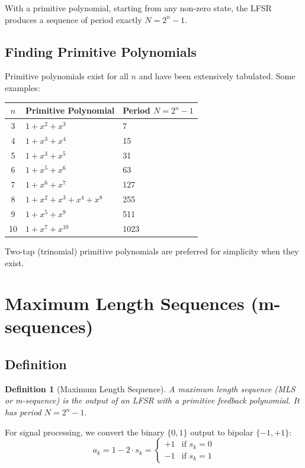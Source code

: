 \documentclass[11pt]{article}
\newtheorem{definition}{Definition}
\begin{document}
With a primitive polynomial, starting from any non-zero state, the LFSR produces a sequence of period exactly $N = 2^n - 1$.

\subsection{Finding Primitive Polynomials}

Primitive polynomials exist for all $n$ and have been extensively tabulated. Some examples:

\begin{center}
\begin{tabular}{cll}
\toprule
$n$ & Primitive Polynomial & Period $N = 2^n - 1$ \\
\midrule
3 & $1 + x^2 + x^3$ & 7 \\
4 & $1 + x^3 + x^4$ & 15 \\
5 & $1 + x^3 + x^5$ & 31 \\
6 & $1 + x^5 + x^6$ & 63 \\
7 & $1 + x^6 + x^7$ & 127 \\
8 & $1 + x^2 + x^3 + x^4 + x^8$ & 255 \\
9 & $1 + x^5 + x^9$ & 511 \\
10 & $1 + x^7 + x^{10}$ & 1023 \\
\bottomrule
\end{tabular}
\end{center}

Two-tap (trinomial) primitive polynomials are preferred for simplicity when they exist.

\section{Maximum Length Sequences (m-sequences)}

\subsection{Definition}

\begin{definition}[Maximum Length Sequence]
A maximum length sequence (MLS or m-sequence) is the output of an LFSR with a primitive feedback polynomial. It has period $N = 2^n - 1$.
\end{definition}

For signal processing, we convert the binary $\{0, 1\}$ output to bipolar $\{-1, +1\}$:
\begin{equation}
a_k = 1 - 2 \cdot s_k = \begin{cases} +1 & \text{if } s_k = 0 \\ -1 & \text{if } s_k = 1 \end{cases}
\end{equation}
\end{document}
